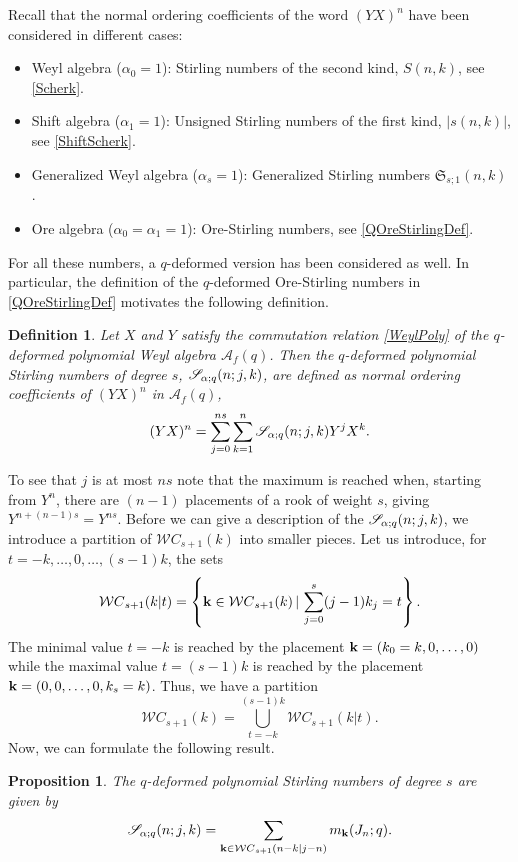 \documentclass[10pt]{amsart}
\newtheorem{proposition}[theorem]{Proposition}%
\newtheorem{definition}[theorem]{Definition}
\begin{document}
Recall that the normal ordering coefficients of the word $(YX)^n$ have been considered in different cases:
\begin{itemize}
\item Weyl algebra ($\alpha_0=1$): Stirling numbers of the second kind, $S(n,k)$, see \eqref{Scherk}.
\item Shift algebra ($\alpha_1=1$): Unsigned Stirling numbers of  the first kind, $|s(n,k)|$, see \eqref{ShiftScherk}.
\item Generalized Weyl algebra ($\alpha_s=1$): Generalized Stirling numbers ${\mathfrak S}_{s;1}(n,k)$ \cite{TMMSMS2011,TMMSMS2012}.
\item Ore algebra ($\alpha_0=\alpha_1=1$): Ore-Stirling numbers, see \eqref{QOreStirlingDef}.
\end{itemize}
For all these numbers, a $q$-deformed version has been considered as well. In particular, the definition of the $q$-deformed Ore-Stirling numbers in \eqref{QOreStirlingDef} motivates the following definition.
\begin{definition} Let $X$ and $Y$ satisfy the commutation relation \eqref{WeylPoly} of the $q$-deformed polynomial Weyl algebra ${\mathcal A}_f(q)$. Then the {\em $q$-deformed polynomial Stirling numbers of degree $s$}, ${\mathscr S}_{{\bf \alpha};q}(n;j,k)$, are defined as normal ordering coefficients of $(YX)^n$ in ${\mathcal A}_f(q)$,
$$
(YX)^n=\sum_{j=0}^{ns}\sum_{k=1}^n {\mathscr S}_{{\bf \alpha};q}(n;j,k )Y^j X^{k}. 
$$
\end{definition}
To see that $j$ is at most $ns$ note that the maximum is reached when, starting from $Y^n$, there are $(n-1)$ placements of a rook of weight $s$, giving $Y^{n+(n-1)s}=Y^{ns}$. Before we can give a description of the ${\mathscr S}_{{\bf \alpha};q}(n;j,k)$, we introduce a partition of  ${\mathcal WC}_{s+1}(k)$ into smaller pieces. Let us introduce, for $t=-k,\ldots,0,\ldots, (s-1)k$, the sets
$$
{\mathcal WC}_{s+1}(k|t)=\left\{{\bf k} \in {\mathcal WC}_{s+1}(k) \, | \, \sum_{j=0}^s (j-1)k_j = t \right\}.
$$
The minimal value $t=-k$ is reached by the placement ${\bf k}=(k_0=k,0,\ldots,0)$ while the maximal value $t=(s-1)k$ is reached by the placement ${\bf k}=(0,0,\ldots,0,k_s=k)$. Thus, we have a partition
\begin{equation}\label{partition}
{\mathcal WC}_{s+1}(k)=\bigcup_{t=-k}^{(s-1)k} {\mathcal WC}_{s+1}(k|t).
\end{equation}
Now, we can formulate the following result. 
\begin{proposition} The $q$-deformed polynomial Stirling numbers of degree $s$ are given by 
\begin{equation}\label{PolyStir}
{\mathscr S}_{{\bf \alpha};q}(n;j,k)=\sum_{{\bf k} \in {\mathcal WC}_{s+1}(n-k|j-n)} m_{{\bf k}}(J_n;q).
\end{equation}
\end{proposition}
\end{document}
